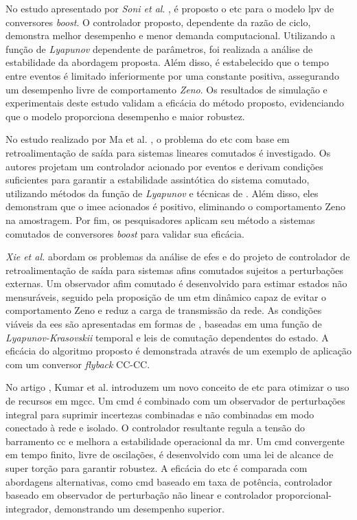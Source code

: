 No estudo apresentado por \textit{Soni et al}. \cite{Soni2023}, é proposto o \acrshort{etc} para o modelo \acrshort{lpv} de conversores \textit{boost}. O controlador proposto, dependente da razão de ciclo, demonstra melhor desempenho e menor demanda computacional. Utilizando a função de \textit{Lyapunov } dependente de parâmetros, foi realizada a análise de estabilidade da abordagem proposta. Além disso, é estabelecido que o tempo entre eventos é limitado inferiormente por uma constante positiva, assegurando um desempenho livre de comportamento \textit{Zeno}. Os resultados de simulação e experimentais deste estudo validam a eficácia do método proposto, evidenciando que o modelo proporciona desempenho e maior robustez.

No estudo realizado por Ma et al. \cite{Ma2016}, o problema do \acrshort{etc} com base em retroalimentação de saída para sistemas lineares comutados é investigado. Os autores projetam um controlador acionado por eventos e derivam condições suficientes para garantir a estabilidade assintótica do sistema comutado, utilizando métodos da função de \textit{Lyapunov} e técnicas de . Além disso, eles demonstram que o \acrshort{imee} acionados é positivo, eliminando o comportamento Zeno na amostragem. Por fim, os pesquisadores aplicam seu método a sistemas comutados de conversores \textit{boost} para validar sua eficácia.

\textit{Xie et al.} \cite{Xie2023} abordam os problemas da análise de \acrshort{efes} e do projeto de controlador de retroalimentação de saída para sistemas afins comutados sujeitos a perturbações externas. Um observador afim comutado é desenvolvido para estimar estados não mensuráveis, seguido pela proposição de um \acrshort{etm} dinâmico capaz de evitar o comportamento Zeno e reduz a carga de transmissão da rede. As condições viáveis da \acrshort{ees} são apresentadas em formas de , baseadas em uma função de \textit{Lyapunov-Krasovskii} temporal e leis de comutação dependentes do estado. A eficácia do algoritmo proposto é demonstrada através de um exemplo de aplicação com um conversor \textit{flyback} CC-CC.

No artigo \cite{Kumar2020}, Kumar et al. introduzem um novo conceito de \acrshort{etc} para otimizar o uso de recursos em \acrshort{mgcc}. Um \acrfull{cmd} é combinado com um observador de perturbações integral para suprimir incertezas combinadas e não combinadas em modo conectado à rede e isolado. O controlador resultante regula a tensão do barramento \acrshort{cc} e melhora a estabilidade operacional da \acrshort{mr}. Um \acrshort{cmd} convergente em tempo finito, livre de oscilações, é desenvolvido com uma lei de alcance de super torção para garantir robustez. A eficácia do \acrshort{etc} é comparada com abordagens alternativas, como \acrshort{cmd} baseado em taxa de potência, controlador baseado em observador de perturbação não linear e controlador proporcional-integrador, demonstrando um desempenho superior.

